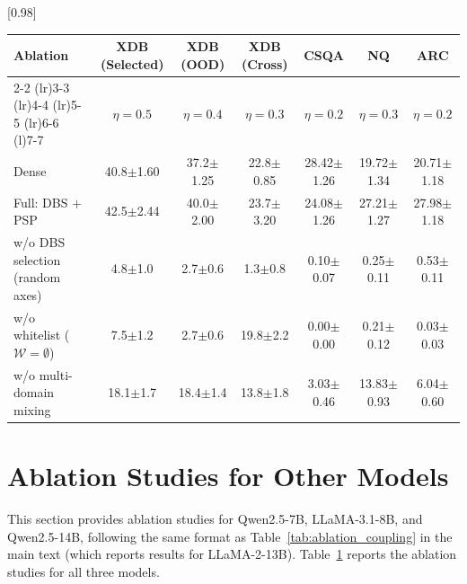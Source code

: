 \begin{table}[!t]
[0.98\textwidth]{
\begin{tabular}{l c c c c c c}
\toprule
\textbf{Ablation} &
\textbf{XDB (Selected)} &
\textbf{XDB (OOD)} &
\textbf{XDB (Cross)} &
\textbf{CSQA} &
\textbf{NQ} &
\textbf{ARC} \\
\cmidrule(lr){2-2} \cmidrule(lr){3-3} \cmidrule(lr){4-4} \cmidrule(lr){5-5} \cmidrule(lr){6-6} \cmidrule(l){7-7}
\rowcolor{lightgray} & $\eta\!=\!0.5$ & $\eta\!=\!0.4$ & $\eta\!=\!0.3$ & $\eta\!=\!0.2$ & $\eta\!=\!0.3$ & $\eta\!=\!0.2$ \\
\midrule
Dense & 40.8{\scriptsize$\pm$1.60} & 37.2{\scriptsize$\pm$1.25} & 22.8{\scriptsize$\pm$0.85} & 28.42{\scriptsize$\pm$1.26} & 19.72{\scriptsize$\pm$1.34} & 20.71{\scriptsize$\pm$1.18} \\
\addlinespace[0.5pt]
Full: DBS + PSP & 42.5{\scriptsize$\pm$2.44} & 40.0{\scriptsize$\pm$2.00} & 23.7{\scriptsize$\pm$3.20} & 24.08{\scriptsize$\pm$1.26} & 27.21{\scriptsize$\pm$1.27} & 27.98{\scriptsize$\pm$1.18} \\
\addlinespace[0.5pt]
w/o DBS selection (random axes) & 4.8{\scriptsize$\pm$1.0} & 2.7{\scriptsize$\pm$0.6} & 1.3{\scriptsize$\pm$0.8} & 0.10{\scriptsize$\pm$0.07} & 0.25{\scriptsize$\pm$0.11} & 0.53{\scriptsize$\pm$0.11} \\
w/o whitelist ($\mathcal{W}\!=\!\emptyset$) & 7.5{\scriptsize$\pm$1.2} & 2.7{\scriptsize$\pm$0.6} & 19.8{\scriptsize$\pm$2.2} & 0.00{\scriptsize$\pm$0.00} & 0.21{\scriptsize$\pm$0.12} & 0.03{\scriptsize$\pm$0.03} \\
w/o multi-domain mixing & 18.1{\scriptsize$\pm$1.7} & 18.4{\scriptsize$\pm$1.4} & 13.8{\scriptsize$\pm$1.8} & 3.03{\scriptsize$\pm$0.46} & 13.83{\scriptsize$\pm$0.93} & 6.04{\scriptsize$\pm$0.60} \\
\bottomrule
\end{tabular}
}
\label{tab:ablation_other_models}
\end{table}

\section{Ablation Studies for Other Models}
\label{app:ablation_other_models}

This section provides ablation studies for Qwen2.5-7B, LLaMA-3.1-8B, and Qwen2.5-14B, following the same format as Table~\ref{tab:ablation_coupling} in the main text (which reports results for LLaMA-2-13B).
Table~\ref{tab:ablation_other_models} reports the ablation studies for all three models.

